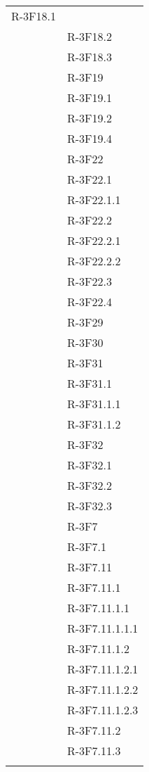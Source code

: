 \begin{longtable}{l p{3cm}}
	R-3F18.1 \tabularnewline &
	
	R-3F18.2 \tabularnewline &
	
	R-3F18.3 \tabularnewline &
	
	R-3F19 \tabularnewline &
	
	R-3F19.1 \tabularnewline &
	
	R-3F19.2 \tabularnewline &
	
	R-3F19.4 \tabularnewline &
	
	R-3F22 \tabularnewline &
	
	R-3F22.1 \tabularnewline &
	
	R-3F22.1.1 \tabularnewline &
	
	R-3F22.2 \tabularnewline &
	
	R-3F22.2.1 \tabularnewline &
	
	R-3F22.2.2 \tabularnewline &
	
	R-3F22.3 \tabularnewline &
	
	R-3F22.4 \tabularnewline &
	
	R-3F29 \tabularnewline &
	
	R-3F30 \tabularnewline &
	
	R-3F31 \tabularnewline &
	
	R-3F31.1 \tabularnewline &
	
	R-3F31.1.1 \tabularnewline &
	
	R-3F31.1.2 \tabularnewline &
	
	R-3F32 \tabularnewline &
	
	R-3F32.1 \tabularnewline &
	
	R-3F32.2 \tabularnewline &
	
	R-3F32.3 \tabularnewline &
	
	R-3F7 \tabularnewline &
	
	R-3F7.1 \tabularnewline &
	
	R-3F7.11 \tabularnewline &
	
	R-3F7.11.1 \tabularnewline &
	
	R-3F7.11.1.1 \tabularnewline &
	
	R-3F7.11.1.1.1 \tabularnewline &
	
	R-3F7.11.1.2 \tabularnewline &
	
	R-3F7.11.1.2.1 \tabularnewline &
	
	R-3F7.11.1.2.2 \tabularnewline &
	
	R-3F7.11.1.2.3 \tabularnewline &
	
	R-3F7.11.2 \tabularnewline &
	
	R-3F7.11.3 \tabularnewline &
	

\end{longtable}
